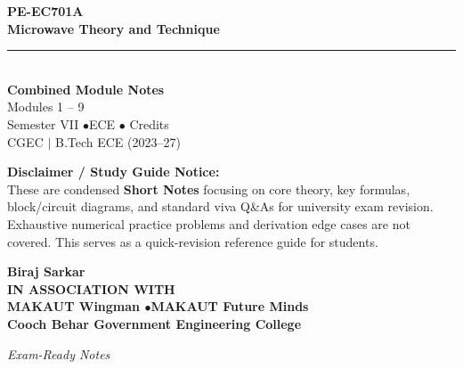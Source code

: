 \documentclass[12pt,a4paper]{article}
\begin{document}
\thispagestyle{empty}


\vspace*{1.0cm}
\begin{center}
  {\Huge\bfseries\color{myred} PE-EC701A}\\[10pt]
  {\LARGE\bfseries\color{mydark} Microwave Theory and Technique}\\[20pt]
  {\color{myred}\rule{0.7\linewidth}{1.5pt}}\\[18pt]
  {\Large\color{myteal}\textbf{Combined Module Notes}}\\[8pt]
  {\large\color{mydark} Modules 1 -- 9}\\[40pt]
  {\normalsize\color{mydark} Semester VII \quad$\bullet$\quad ECE \quad$\bullet$ Credits}\\[12pt]
  {\normalsize\color{mydark} CGEC \;$|$\; B.Tech ECE (2023--27)}
\end{center}
\vspace{1.0cm}
\begin{center}
  \begin{tcolorbox}[colback=mygray, colframe=mgframe, boxrule=0.5pt, arc=3pt, width=0.85\linewidth]
    \centering\small\color{mydark}
    \textbf{Disclaimer / Study Guide Notice:}\\
    These are condensed \textbf{Short Notes} focusing on core theory, key formulas, block/circuit diagrams, and standard viva Q\&As for university exam revision. Exhaustive numerical practice problems and derivation edge cases are not covered. This serves as a quick-revision reference guide for students.
  \end{tcolorbox}
\end{center}
\vfill
\vspace{0.6cm}
\begin{center}
  {\large\bfseries\color{mypurple} Biraj Sarkar}\\[16pt]
  {\footnotesize\color{watermark}\textbf{IN ASSOCIATION WITH}}\\[8pt]
  {\small\bfseries\color{mydark} MAKAUT Wingman \quad$\bullet$\quad MAKAUT Future Minds}\\[12pt]
  {\large\bfseries\color{myteal} Cooch Behar Government Engineering College}
\end{center}
\vfill
\begin{center}{\small\color{watermark}\textit{Exam-Ready Notes}}\end{center}
\clearpage
\end{document}

